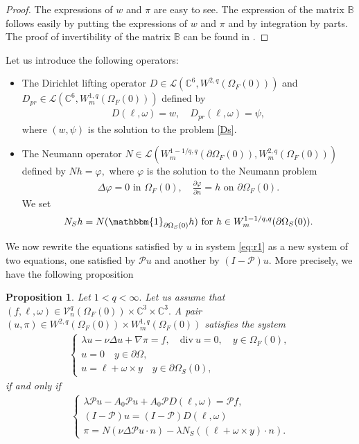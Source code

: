 \documentclass[12pt,a4paper,reqno]{amsart}
\newtheorem{proposition}[theorem]{Proposition}
\theoremstyle{definition}
\theoremstyle{remark}
\numberwithin{equation}{section}
\newcommand{\oso}{\Omega_{S}(0)}
\newcommand{\ofo}{\Omega_{F}(0)}
\newcommand{\ct}{\mathbb{C}^{3}}
\newcommand{\mpp}{\mathcal{P}}
\newcommand{\mv}{\mathcal{V}}
\begin{document}
\begin{proof}
The expressions of $w$ and $\pi$ are easy to see. The expression of the matrix $\mathbb{B}$ follows easily by putting the expressions of $w$ and $\pi$ and by integration by parts. The proof of invertibility of the matrix $\mathbb{B}$ can be found in   \cite[Chapter 5]{HB65}.
\end{proof}


Let us introduce the following operators:
\begin{itemize}
\item The Dirichlet lifting operator $D \in {\mathcal L}(\mathbb{C}^{6},W^{2,q}(\ofo))$ and
$D_{pr} \in {\mathcal L}(\mathbb{C}^{6},W^{1,q}_{m}(\ofo))$ defined by
\begin{align}
 D(\ell,\omega) = w, \quad D_{pr}(\ell,\omega) = \psi,
\end{align}
where $(w,\psi)$  is the solution to the problem \eqref{Ds}.
\item The Neumann operator $N \in {\mathcal L}(W^{1-1/q,q}_{m}(\partial\ofo), W^{2,q}_{m}(\ofo))$ defined by $N h = \varphi,$ where $\varphi$ is the solution to the Neumann problem
\begin{align} \label{N}
\Delta\varphi= 0 \mbox{ in } \ofo, \quad \frac{\partial \varphi}{\partial n} = h \mbox{ on } \partial\ofo.
\end{align}
We set
\begin{align} \label{Ns}
N_{S} h = N (\mathbbm{1}_{\partial \oso}  h) \mbox{ for }  h \in W^{1-1/q,q}_{m}(\partial\oso).
\end{align}
\end{itemize}





We now rewrite the equations satisfied by $u$ in system \eqref{eq:r1} as a new system of two equations, one satisfied by $\mpp u$ and another by $(I-\mpp) u.$ More precisely, we have the following proposition
\begin{proposition} \label{equiv1}
Let $1 <  q < \infty.$ Let us assume that  $(f, \ell,\omega) \in \mv^q_{n}(\ofo) \times \ct \times \ct.$ A pair $(u,\pi) \in W^{2,q}(\ofo) \times W^{1,q}_{m}(\ofo)$  satisfies the system
\begin{align} \label{stokes1}
\begin{cases}
\lambda u - \nu \Delta u + \nabla \pi = f, \quad \mathrm{ div} \ u = 0, \quad y \in \ofo,  \\
 u  = 0 \quad  y \in \partial \Omega,  \\
 u = \ell + \omega \times y \quad  y \in  \partial\oso,
\end{cases}
\end{align}
if and only if
\begin{align} \label{stokes2}
\begin{cases}
\lambda \mpp u  - A_{0} \mpp u  + A_{0} \mpp D(\ell,\omega) = \mpp f,  \\
(I - \mpp) u = (I - \mpp) D (\ell,\omega )  \\
\pi = N (\nu \Delta \mpp u \cdot n) - \lambda N_{S} ((\ell + \omega \times y) \cdot n) .
\end{cases}
\end{align}
\end{proposition}
\end{document}
